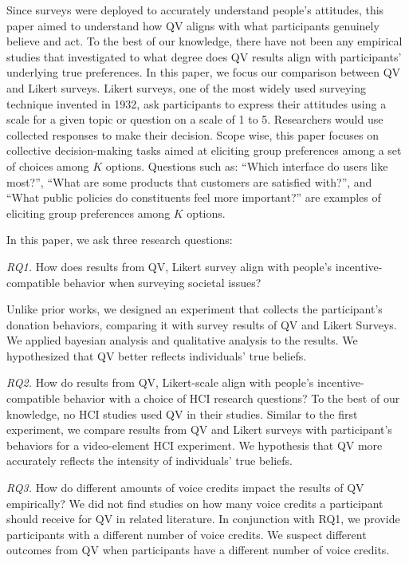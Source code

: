 
Since surveys were deployed to accurately understand people's attitudes, this paper aimed to understand how QV aligns with what participants genuinely believe and act. To the best of our knowledge, there have not been any empirical studies that investigated to what degree does QV results align with participants' underlying true preferences. In this paper, we focus our comparison between QV and Likert surveys. Likert surveys, one of the most widely used surveying technique invented in 1932, ask participants to express their attitudes using a scale for a given topic or question on a scale of 1 to 5. Researchers would use collected responses to make their decision. Scope wise, this paper focuses on collective decision-making tasks aimed at eliciting group preferences among a set of choices among $K$ options. Questions such as: ``Which interface do users like most?'', ``What are some products that customers are satisfied with?'', and  ``What public policies do constituents feel more important?'' are examples of eliciting group preferences among $K$ options.

In this paper, we ask three research questions: 

\textit{RQ1.} How does results from QV, Likert survey align with people's incentive-compatible behavior when surveying societal issues? 

Unlike prior works, we designed an experiment that collects the participant's donation behaviors, comparing it with survey results of QV and Likert Surveys. We applied bayesian analysis and qualitative analysis to the results. We hypothesized that QV better reflects individuals' true beliefs. 

\textit{RQ2.} How do results from QV, Likert-scale align with people's incentive-compatible behavior with a choice of HCI research questions? 
To the best of our knowledge, no  HCI studies used QV in their studies. Similar to the first experiment, we compare results from QV and Likert surveys with participant's behaviors for a video-element HCI experiment. We hypothesis that QV more accurately reflects the intensity of individuals' true beliefs. 

\textit{RQ3.} How do different amounts of voice credits impact the results of QV empirically?
We did not find studies on how many voice credits a participant should receive for QV in related literature. In conjunction with RQ1, we provide participants with a different number of voice credits. We suspect different outcomes from QV when participants have a different number of voice credits.


